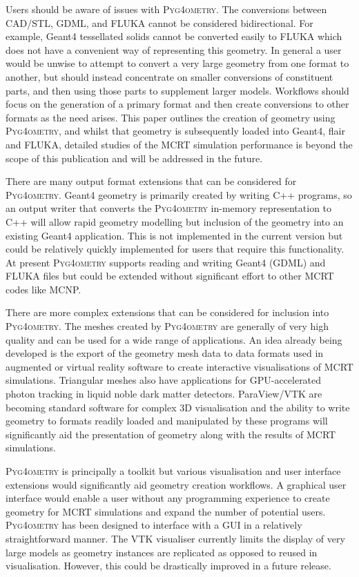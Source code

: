 \documentclass[final,5p,times,twocolumn]{elsarticle}
\newcommand{\PYGEOMETRY}{\textsc{Pyg4ometry}}
\begin{document}
Users should be aware of issues with \PYGEOMETRY{}. The conversions between CAD/STL, GDML, and FLUKA
cannot be considered bidirectional. For example, Geant4 tessellated solids cannot be converted easily to FLUKA which does not
have a convenient way of representing this geometry. In general a user would be unwise to attempt to convert a very large
geometry from one format to another, but should instead concentrate on smaller conversions of constituent parts, 
and then using those parts to supplement larger models. Workflows should focus
on the generation of a primary format and then create conversions to other formats as the need arises. This paper outlines
the creation of geometry using \PYGEOMETRY{}, and whilst that geometry is subsequently loaded into Geant4, flair and FLUKA, detailed
studies of the MCRT simulation performance is beyond the scope of this publication and will be addressed in the future.

There are many output format extensions that can be considered for \PYGEOMETRY{}.
Geant4 geometry is primarily created by writing C++ programs, so an output writer that
converts the \PYGEOMETRY{} in-memory representation to C++ will allow rapid geometry
modelling but inclusion of the geometry into an existing Geant4 application. This is not
implemented in the current version but could be relatively quickly implemented for users that
require this functionality. At present \PYGEOMETRY{} supports reading and writing
Geant4 (GDML) and FLUKA files but could be extended without significant effort to other MCRT codes
like MCNP.

There are more complex extensions that can be considered for inclusion into \PYGEOMETRY{}.
The meshes created by \PYGEOMETRY{} are generally of very high quality and can be used for a
wide range of applications. An idea already being developed is the export of the geometry mesh data to
data formats used in augmented or virtual reality software to create interactive visualisations of MCRT
simulations.  Triangular meshes also have applications for GPU-accelerated photon tracking in
liquid noble dark matter detectors. ParaView/VTK are becoming standard software for complex 3D visualisation and
the ability to write geometry to formats readily loaded and manipulated by these programs will
significantly aid the presentation of geometry along with the results of MCRT simulations.

\PYGEOMETRY{} is principally a toolkit but various visualisation and user interface extensions would
significantly aid geometry creation workflows. A graphical user interface would enable a user without any
 programming experience to create geometry for MCRT simulations and expand the number of potential users.
\PYGEOMETRY{} has been designed to interface with a GUI in a relatively straightforward manner. The VTK visualiser currently
limits the display of very large models as geometry instances are replicated as opposed to reused in visualisation.  However,
this could be drastically improved in a future release.
\end{document}
